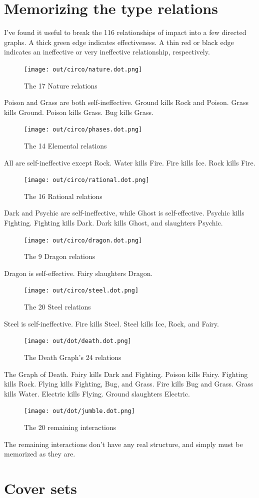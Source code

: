 \section{Memorizing the type relations}
I've found it useful to break the 116 relationships of impact into a few directed graphs.
A thick green edge indicates effectiveness.
A thin red or black edge indicates an ineffective or very ineffective relationship, respectively.

\begin{figure}[h]
\centering
\texttt{[image: out/circo/nature.dot.png]}
\caption{The 17 Nature relations}
\end{figure}
Poison and Grass are both self-ineffective.
Ground kills Rock and Poison.
Grass kills Ground.
Poison kills Grass.
Bug kills Grass.

\begin{figure}[h]
\centering
\texttt{[image: out/circo/phases.dot.png]}
\caption{The 14 Elemental relations}
\end{figure}
All are self-ineffective except Rock.
Water kills Fire.
Fire kills Ice.
Rock kills Fire.

\begin{figure}[h]
\centering
\texttt{[image: out/circo/rational.dot.png]}
\caption{The 16 Rational relations}
\end{figure}
Dark and Psychic are self-ineffective, while Ghost is self-effective.
Psychic kills Fighting.
Fighting kills Dark.
Dark kills Ghost, and slaughters Psychic.

\begin{figure}
\centering
\texttt{[image: out/circo/dragon.dot.png]}
\caption{The 9 Dragon relations}
\end{figure}
Dragon is self-effective.
Fairy slaughters Dragon.

\begin{figure}
\centering
\texttt{[image: out/circo/steel.dot.png]}
\caption{The 20 Steel relations}
\end{figure}
Steel is self-ineffective.
Fire kills Steel.
Steel kills Ice, Rock, and Fairy.

\begin{figure}[h]
\centering
\texttt{[image: out/dot/death.dot.png]}
\caption{The Death Graph's 24 relations}
\end{figure}
The Graph of Death.
Fairy kills Dark and Fighting.
Poison kills Fairy.
Fighting kills Rock.
Flying kills Fighting, Bug, and Grass.
Fire kills Bug and Grass.
Grass kills Water.
Electric kills Flying.
Ground slaughters Electric.

\begin{figure}[h]
\centering
\texttt{[image: out/dot/jumble.dot.png]}
\caption{The 20 remaining interactions}
\end{figure}
The remaining interactions don't have any real structure, and simply must be
memorized as they are.

\section{Cover sets}
